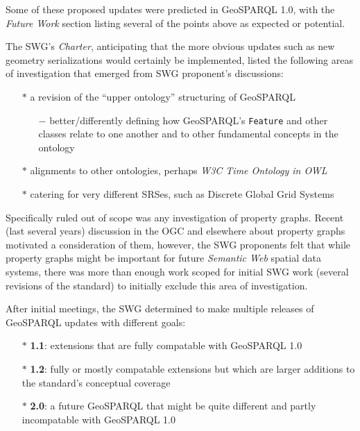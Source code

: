 \documentclass[runningheads]{llncs}
\begin{document}
Some of these proposed updates were predicted in GeoSPARQL 1.0, with the \textit{Future Work} section listing several of the 
points above as expected or potential.

The SWG's \textit{Charter}, anticipating that the more obvious updates such as new geometry serializations would certainly
be implemented, listed the following areas of investigation that emerged from SWG proponent's discussions:

\begin{itemize}
    \item[$\ast$] a revision of the ``upper  ontology'' structuring of GeoSPARQL
    \begin{itemize}
        \item[$-$] better/differently defining how GeoSPARQL's \texttt{Feature} and other classes relate to one another and to other fundamental concepts in the ontology
    \end{itemize} 
    \item[$\ast$] alignments to other ontologies, perhaps \textit{W3C Time Ontology in OWL}\cite{simon_cox_time_2017}
    \item[$\ast$] catering for very different SRSes, such as Discrete Global Grid Systems
\end{itemize}

Specifically ruled out of scope was any investigation of property graphs. Recent (last several years) discussion in the OGC and 
elsewhere about property graphs motivated a consideration of them, however, the SWG proponents felt that while property graphs might 
be important for future \textit{Semantic Web} spatial data systems, there was more than enough work scoped for initial SWG work
(several revisions of the standard) to initially exclude this area of investigation.

After initial meetings, the SWG determined to make multiple releases of GeoSPARQL updates with different goals:

\begin{itemize}
    \item[$\ast$] \textbf{1.1}: extensions that are fully compatable with GeoSPARQL 1.0
    \item[$\ast$] \textbf{1.2}: fully or mostly compatable extensions but which are larger additions to the standard's conceptual coverage
    \item[$\ast$] \textbf{2.0}: a future GeoSPARQL that might be quite different and partly incompatable with GeoSPARQL 1.0
\end{itemize} 
\end{document}
